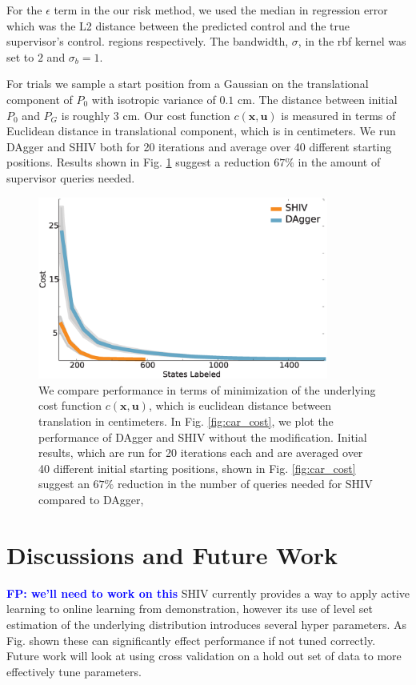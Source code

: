 \documentclass[10pt, conference]{ieeeconf}      %
\newcommand{\bu}{\mathbf{u}}
\newcommand{\bx}{\mathbf{x}}
\newcommand{\fpnote}[1]{\ifthenelse{\boolean{include-notes}}%
 {\textcolor{blue}{\textbf{FP: #1}}}{}}
\begin{document}
For the $\epsilon$ term in the our risk method, we used the median in regression error which was the L2 distance between the predicted control and the true supervisor's control. 
regions respectively. The bandwidth, $\sigma$, in the rbf kernel was set to $2$ and $\sigma_b = 1$.

For trials we sample a start position from a Gaussian on the translational component of $P_0$ with isotropic variance of
$0.1$ cm. The distance between initial $P_0$ and $P_G$ is roughly $3$ cm. Our cost function $c(\bx,\bu)$ is measured in
terms of Euclidean distance in translational component, which is in centimeters. We run DAgger and SHIV both for 20 iterations and average over 40 different starting positions.
Results shown in Fig. \ref{fig:needle} suggest a reduction $67\%$ in the amount of supervisor queries needed. 





\begin{figure}[t!]
\centering
\includegraphics[width=\columnwidth, height=6cm]{figures/needle_insertion_results.eps}
\caption{We compare performance in terms of minimization of the underlying cost function $c(\bx,\bu)$, which is euclidean distance between translation in centimeters. In Fig. \ref{fig:car_cost}, we plot the performance of DAgger and SHIV without the modification.  Initial results, which are run for 20 iterations each and are averaged over 40 different initial starting positions, shown in Fig. \ref{fig:car_cost} suggest an $67\%$ reduction in the number of queries needed for SHIV compared to DAgger,}
\vspace*{-10pt}
\label{fig:needle}
\end{figure}



\section{Discussions and Future Work}
\fpnote{we'll need to work on this}
SHIV currently provides a way to apply active learning to online learning from demonstration, however its use of level set estimation of the underlying distribution introduces several hyper parameters. As Fig. shown these can significantly effect performance if not tuned correctly. Future work will look at using cross validation on a hold out set of data to more effectively tune parameters. 
\end{document}
